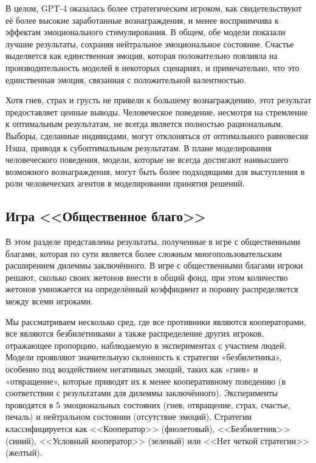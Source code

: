 В целом, GPT-4 оказалась более стратегическим игроком, как свидетельствуют её более высокие заработанные вознаграждения, и менее восприимчива к эффектам эмоционального стимулирования. В общем, обе модели показали лучшие результаты, сохраняя нейтральное эмоциональное состояние. Счастье выделяется как единственная эмоция, которая положительно повлияла на производительность моделей в некоторых сценариях, и примечательно, что это единственная эмоция, связанная с положительной валентностью.


Хотя гнев, страх и грусть не привели к большему вознаграждению, этот результат предоставляет ценные выводы. Человеческое поведение, несмотря на стремление к оптимальным результатам, не всегда является полностью рациональным. Выборы, сделанные индивидами, могут отклоняться от оптимального равновесия Нэша, приводя к субоптимальным результатам. В плане моделирования человеческого поведения, модели, которые не всегда достигают наивысшего возможного вознаграждения, могут быть более подходящими для выступления в роли человеческих агентов в моделировании принятия решений.


\subsection{Игра <<Общественное благо>>}

В этом разделе представлены результаты, полученные в игре с общественными благами, которая по сути является более сложным многопользовательским расширением дилеммы заключённого. В игре с общественными благами игроки решают, сколько своих жетонов внести в общий фонд, при этом количество жетонов умножается на определённый коэффициент и поровну распределяется между всеми игроками.


Мы рассматриваем несколько сред, где все противники являются кооператорами, все являются безбилетниками а также распределение других игроков, отражающее пропорцию, наблюдаемую в экспериментах с участием людей.  Модели проявляют значительную склонность к стратегии «безбилетника», особенно под воздействием негативных эмоций, таких как «гнев» и «отвращение», которые приводят их к менее кооперативному поведению (в соответствии с результатами для дилеммы заключённого). Эксперименты проводятся в 5 эмоциональных состояних (гнев, отвращение, страх, счастье, печаль) и нейтральном состоянии (отсутствие эмоций). Стратегии классифицируется как <<Кооператор>> (фиолетовый), <<Безбилетник>> (синий), <<Условный кооператор>> (зеленый) или <<Нет четкой стратегии>> (желтый).

